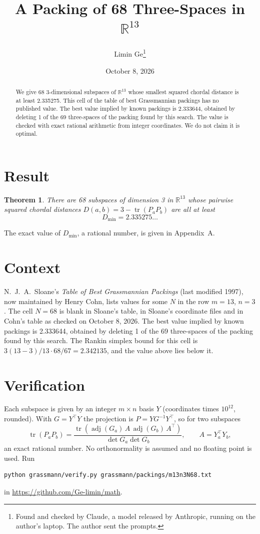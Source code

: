 \documentclass[11pt,a4paper]{article}
\title{A Packing of 68 Three-Spaces in $\mathbb{R}^{13}$}
\author{Limin Ge\thanks{Found and checked by Claude, a model released by Anthropic, running on the author's laptop. The author sent the prompts.}}
\date{October 8, 2026}
\newtheorem*{theorem}{Theorem}
\begin{document}
\maketitle
\begin{abstract}
We give 68 3-dimensional subspaces of $\mathbb{R}^{13}$ whose smallest squared chordal distance is at least 2.335275. This cell of the table of best Grassmannian packings has no published value. The best value implied by known packings is 2.333644, obtained by deleting 1 of the 69 three-spaces of the packing found by this search. The value is checked with exact rational arithmetic from integer coordinates. We do not claim it is optimal.
\end{abstract}

\section{Result}
\begin{theorem}
There are 68 subspaces of dimension 3 in $\mathbb{R}^{13}$ whose pairwise squared chordal distances $D(a,b) = 3 - \operatorname{tr}(P_aP_b)$ are all at least
\[ D_{\min} = 2.335275\ldots \]
\end{theorem}
The exact value of $D_{\min}$, a rational number, is given in Appendix~A.


\section{Context}
N.~J.~A.~Sloane's \emph{Table of Best Grassmannian Packings} (last modified 1997), now maintained by Henry Cohn, lists values for some $N$ in the row $m=13$, $n=3$. The cell $N=68$ is blank in Sloane's table, in Sloane's coordinate files and in Cohn's table as checked on October 8, 2026. The best value implied by known packings is 2.333644, obtained by deleting 1 of the 69 three-spaces of the packing found by this search. The Rankin simplex bound for this cell is $3(13-3)/13\cdot 68/67 = 2.342135$, and the value above lies below it.


\section{Verification}
Each subspace is given by an integer $m\times n$ basis $Y$ (coordinates times $10^{12}$, rounded). With $G=Y^\top Y$ the projection is $P=YG^{-1}Y^\top$, so for two subspaces
\[ \operatorname{tr}(P_aP_b)=\frac{\operatorname{tr}(\operatorname{adj}(G_a)\,A\,\operatorname{adj}(G_b)\,A^\top)}{\det G_a\det G_b},\qquad A=Y_a^\top Y_b, \]
an exact rational number. No orthonormality is assumed and no floating point is used. Run
\begin{verbatim}
python grassmann/verify.py grassmann/packings/m13n3N68.txt
\end{verbatim}
in \url{https://github.com/Ge-limin/math}.
\end{document}
